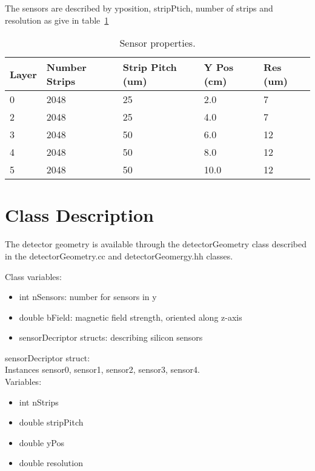 \documentclass[aps,prd,superscriptaddress,floatfix]{revtex4}
\begin{document}
The sensors are described by yposition, stripPtich, number of strips
and resolution as give in table~\ref{tab:detectorTable}



\begin{table}
\caption{\label{tab:detectorTable} Sensor properties.}
\begin{tabular}{|l|l|l|l|l|}
\hline 
Layer & Number Strips & Strip Pitch (um) & Y Pos (cm) & Res (um)\\
\hline
0 & 2048 & 25	& 2.0 & 7	 \\
2 & 2048 & 25	& 4.0 & 7	 \\
3 & 2048 & 50	& 6.0 & 12	 \\
4 & 2048 & 50	& 8.0 & 12	 \\
5 & 2048 & 50	& 10.0 & 12	 \\
\hline
\end{tabular}
\end{table}

\section{Class Description}
The detector geometry is available through the detectorGeometry class
described in the detectorGeometry.cc and detectorGeomergy.hh classes.

Class variables:
\begin{itemize}
\item int nSensors: number for sensors in y
\item double bField: magnetic field strength, oriented along z-axis
\item sensorDecriptor structs: describing silicon sensors
\end{itemize}




sensorDecriptor struct:\\
Instances sensor0, sensor1, sensor2, sensor3, sensor4.\\
Variables:\\
\begin{itemize}
\item int nStrips
\item double stripPitch
\item double yPos
\item double resolution
\end{itemize}






% 
\end{document}
